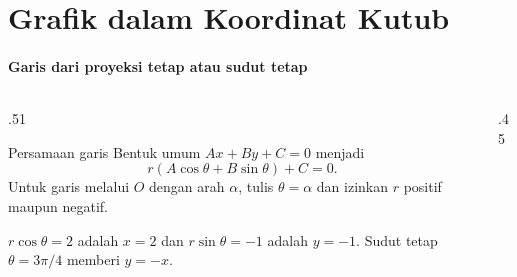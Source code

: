 \documentclass{../../kalkulus-ppt}
\newcommand{\sumbubidang}[4]{%
    \draw[sumbu] (#1,0) -- (#2,0) node[right,font=\scriptsize] {$x$};
    \draw[sumbu] (0,#3) -- (0,#4) node[above,font=\scriptsize] {$y$};
}
\begin{document}
\section{Grafik dalam Koordinat Kutub}

\begin{frame}{\insertsection}
    \framesubtitle{Garis dari proyeksi tetap atau sudut tetap}
    \begin{columns}[c,onlytextwidth]
        \begin{column}{.51\textwidth}
            \begin{block}{Persamaan garis}
                Bentuk umum $Ax+By+C=0$ menjadi
                \[
                    r(A\cos\theta+B\sin\theta)+C=0.
                \]
                Untuk garis melalui $O$ dengan arah $\alpha$,
                tulis $\theta=\alpha$ dan izinkan $r$ positif
                maupun negatif.
            \end{block}
            \begin{contoh}
                $r\cos\theta=2$ adalah $x=2$ dan
                $r\sin\theta=-1$ adalah $y=-1$.
                Sudut tetap $\theta=3\pi/4$ memberi $y=-x$.
            \end{contoh}
        \end{column}
        \begin{column}{.45\textwidth}
            \centering
        \end{column}
    \end{columns}
\end{frame}
\end{document}
